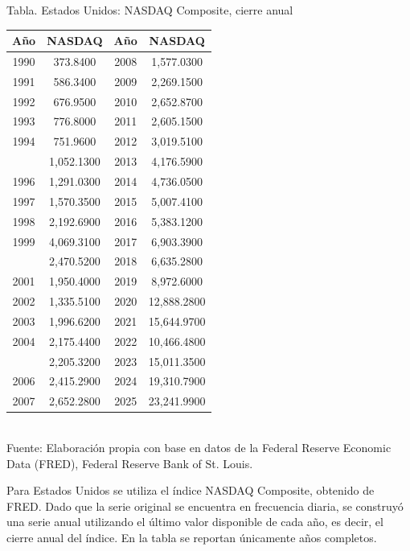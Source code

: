 \documentclass{article}\usepackage[]{graphicx}\usepackage[]{xcolor}
\begin{document}
\begin{center}
Tabla. Estados Unidos: NASDAQ Composite, cierre anual
\end{center}
\begin{center}

\begin{tabular}{cccc}
\toprule
Año & NASDAQ & Año & NASDAQ\\
\midrule
1990 & 373.8400 & 2008 & 1,577.0300\\
1991 & 586.3400 & 2009 & 2,269.1500\\
1992 & 676.9500 & 2010 & 2,652.8700\\
1993 & 776.8000 & 2011 & 2,605.1500\\
1994 & 751.9600 & 2012 & 3,019.5100\\
\addlinespace
1995 & 1,052.1300 & 2013 & 4,176.5900\\
1996 & 1,291.0300 & 2014 & 4,736.0500\\
1997 & 1,570.3500 & 2015 & 5,007.4100\\
1998 & 2,192.6900 & 2016 & 5,383.1200\\
1999 & 4,069.3100 & 2017 & 6,903.3900\\
\addlinespace
2000 & 2,470.5200 & 2018 & 6,635.2800\\
2001 & 1,950.4000 & 2019 & 8,972.6000\\
2002 & 1,335.5100 & 2020 & 12,888.2800\\
2003 & 1,996.6200 & 2021 & 15,644.9700\\
2004 & 2,175.4400 & 2022 & 10,466.4800\\
\addlinespace
2005 & 2,205.3200 & 2023 & 15,011.3500\\
2006 & 2,415.2900 & 2024 & 19,310.7900\\
2007 & 2,652.2800 & 2025 & 23,241.9900\\
\bottomrule
\end{tabular}
\\[0.3em]
{\footnotesize Fuente: Elaboración propia con base en datos de la Federal Reserve Economic Data (FRED), Federal Reserve Bank of St. Louis.}
\end{center}


Para Estados Unidos se utiliza el índice NASDAQ Composite, obtenido de FRED. Dado que la serie original se encuentra en frecuencia diaria, se construyó una serie anual utilizando el último valor disponible de cada año, es decir, el cierre anual del índice. En la tabla se reportan únicamente años completos.
\end{document}
